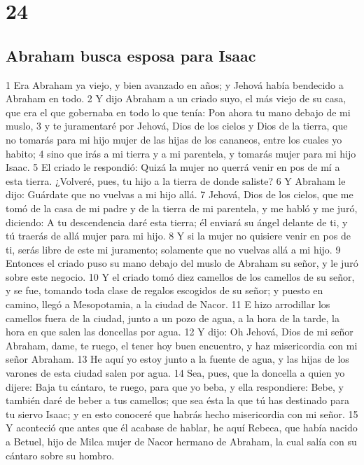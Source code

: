 \chapter{24}

\section*{Abraham busca esposa para Isaac}

1 Era Abraham ya viejo, y bien avanzado en años; y Jehová había bendecido a Abraham en todo.
2 Y dijo Abraham a un criado suyo, el más viejo de su casa, que era el que gobernaba en todo lo que tenía: Pon ahora tu mano debajo de mi muslo,
3 y te juramentaré por Jehová, Dios de los cielos y Dios de la tierra, que no tomarás para mi hijo mujer de las hijas de los cananeos, entre los cuales yo habito;
4 sino que irás a mi tierra y a mi parentela, y tomarás mujer para mi hijo Isaac.
5 El criado le respondió: Quizá la mujer no querrá venir en pos de mí a esta tierra. ¿Volveré, pues, tu hijo a la tierra de donde saliste?
6 Y Abraham le dijo: Guárdate que no vuelvas a mi hijo allá.
7 Jehová, Dios de los cielos, que me tomó de la casa de mi padre y de la tierra de mi parentela, y me habló y me juró, diciendo: A tu descendencia daré esta tierra; él enviará su ángel delante de ti, y tú traerás de allá mujer para mi hijo.
8 Y si la mujer no quisiere venir en pos de ti, serás libre de este mi juramento; solamente que no vuelvas allá a mi hijo.
9 Entonces el criado puso su mano debajo del muslo de Abraham su señor, y le juró sobre este negocio.
10 Y el criado tomó diez camellos de los camellos de su señor, y se fue, tomando toda clase de regalos escogidos de su señor; y puesto en camino, llegó a Mesopotamia, a la ciudad de Nacor.
11 E hizo arrodillar los camellos fuera de la ciudad, junto a un pozo de agua, a la hora de la tarde, la hora en que salen las doncellas por agua.
12 Y dijo: Oh Jehová, Dios de mi señor Abraham, dame, te ruego, el tener hoy buen encuentro, y haz misericordia con mi señor Abraham.
13 He aquí yo estoy junto a la fuente de agua, y las hijas de los varones de esta ciudad salen por agua.
14 Sea, pues, que la doncella a quien yo dijere: Baja tu cántaro, te ruego, para que yo beba, y ella respondiere: Bebe, y también daré de beber a tus camellos; que sea ésta la que tú has destinado para tu siervo Isaac; y en esto conoceré que habrás hecho misericordia con mi señor.
15 Y aconteció que antes que él acabase de hablar, he aquí Rebeca, que había nacido a Betuel, hijo de Milca mujer de Nacor hermano de Abraham, la cual salía con su cántaro sobre su hombro.
